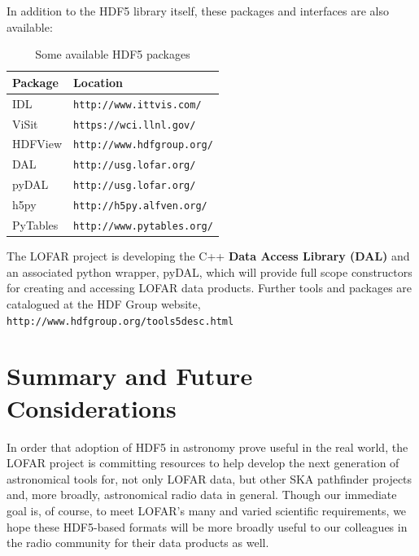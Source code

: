 \documentclass{PoS}
\begin{document}
In addition to the HDF5 library itself,  these packages and interfaces are also available:
\begin{table}[h]
  \centering
  \begin{tabular}{|ll|}
    \hline
    \sc Package& \sc Location\\ 
\hline \hline
 IDL &\verb|http://www.ittvis.com/|\\
ViSit&\verb|https://wci.llnl.gov/|\\
HDFView  &\verb|http://www.hdfgroup.org/|\\
DAL&\verb|http://usg.lofar.org/|\\
pyDAL&\verb|http://usg.lofar.org/|\\
h5py&\verb|http://h5py.alfven.org/|\\
PyTables&\verb|http://www.pytables.org/|\\
\hline
\end{tabular}
\caption{Some available HDF5 packages}
\end{table} 

The LOFAR project is developing the C++ \textbf{Data Access Library (DAL)} and an associated python wrapper, pyDAL, which  will provide full scope constructors for creating and accessing LOFAR data products.  Further tools and packages are catalogued at the HDF Group website, \verb|http://www.hdfgroup.org/tools5desc.html|

\section{Summary and Future Considerations}

In order that adoption of HDF5 in astronomy prove useful in the real
world, the LOFAR  project is committing resources to help develop the
next generation  of astronomical tools for, not only LOFAR data, but other SKA pathfinder projects and, more broadly, astronomical radio data in general.  Though our immediate goal is, of course, to meet LOFAR's many and varied scientific requirements, we hope these HDF5-based formats will be more broadly useful to our colleagues in the radio community for their data products as well.
\end{document}
